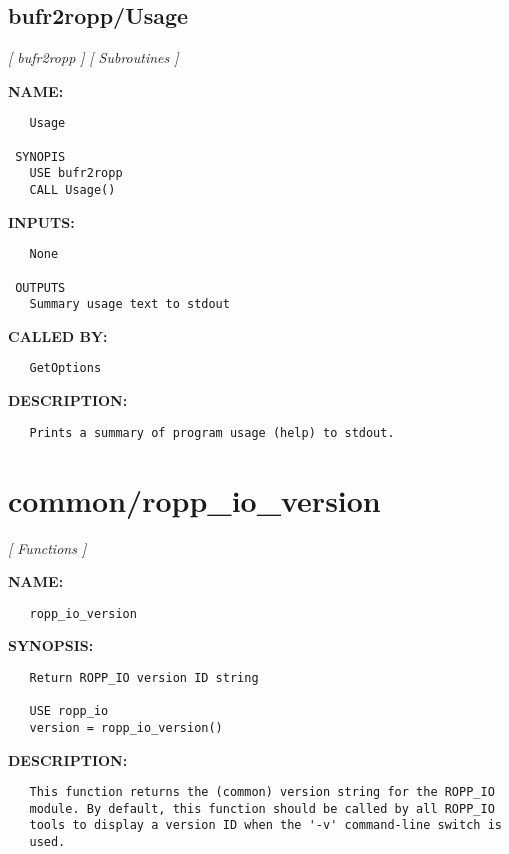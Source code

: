 \subsection{bufr2ropp/Usage}
\textsl{[ bufr2ropp ]}
\textsl{[ Subroutines ]}

\label{ch:robo17}
\label{ch:bufr2ropp_Usage}
\textbf{NAME:}\hspace{0.08in}\begin{Verbatim}
   Usage

 SYNOPIS
   USE bufr2ropp
   CALL Usage()
\end{Verbatim}
\textbf{INPUTS:}\hspace{0.08in}\begin{Verbatim}
   None

 OUTPUTS
   Summary usage text to stdout
\end{Verbatim}
\textbf{CALLED BY:}\hspace{0.08in}\begin{Verbatim}
   GetOptions
\end{Verbatim}
\textbf{DESCRIPTION:}\hspace{0.08in}\begin{Verbatim}
   Prints a summary of program usage (help) to stdout.
\end{Verbatim}
\section{common/ropp\_io\_version}
\textsl{[ Functions ]}

\label{ch:robo18}
\label{ch:common_ropp_io_version}
\textbf{NAME:}\hspace{0.08in}\begin{Verbatim}
   ropp_io_version
\end{Verbatim}
\textbf{SYNOPSIS:}\hspace{0.08in}\begin{Verbatim}
   Return ROPP_IO version ID string

   USE ropp_io
   version = ropp_io_version()
\end{Verbatim}
\textbf{DESCRIPTION:}\hspace{0.08in}\begin{Verbatim}
   This function returns the (common) version string for the ROPP_IO
   module. By default, this function should be called by all ROPP_IO
   tools to display a version ID when the '-v' command-line switch is
   used.
\end{Verbatim}
